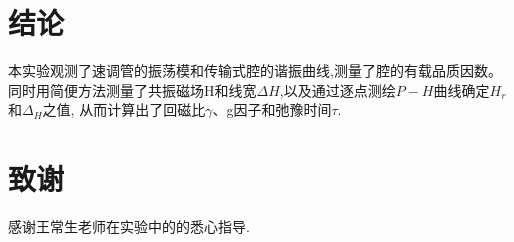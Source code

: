 \documentclass[a4paper]{article}
\begin{document}
\section{结论}\label{conclusions}
本实验观测了速调管的振荡模和传输式腔的谐振曲线,测量了腔的有载品质因数。同时用简便方法测量了共振磁场H和线宽$\Delta H$,以及通过逐点测绘$P-H$曲线确定$H_r$和$\Delta_H$之值, 从而计算出了回磁比$\gamma$、g因子和弛豫时间$\tau$.\\

\section{致谢}\label{acknowledgments}
感谢王常生老师在实验中的的悉心指导.
\end{document}
